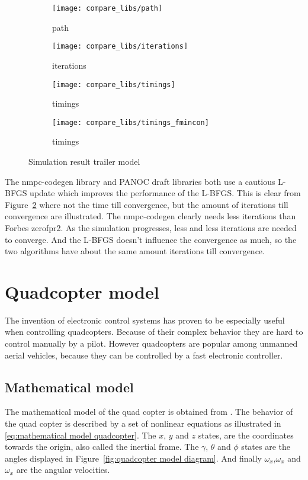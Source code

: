 \begin{figure}[H]
	\centering
	\begin{subfigure}[b]{0.45\textwidth}
		\centering
		\texttt{[image: compare\_libs/path]}
		\caption{path}
		\label{fig:solution path trailer example}
	\end{subfigure}
	\hfill
	\begin{subfigure}[b]{0.45\textwidth}
		\centering
		\texttt{[image: compare\_libs/iterations]}
		\caption{iterations}
		\label{fig:iterations trailer example}
	\end{subfigure}
	
	\begin{subfigure}[b]{0.45\textwidth}
		\centering
		\texttt{[image: compare\_libs/timings]}
		\caption{timings}
		\label{fig:timings trailer example}
	\end{subfigure}
	\hfill
	\begin{subfigure}[b]{0.45\textwidth}
		\centering
		\texttt{[image: compare\_libs/timings\_fmincon]}
		\caption{timings}
		\label{fig:timings fmincon Matlab trailer example}
	\end{subfigure}
	\caption{Simulation result trailer model}
	\label{fig:simulation result trailer model}
\end{figure}

The nmpc-codegen library and PANOC draft libraries both use a cautious L-BFGS update which improves the performance of the L-BFGS. This is clear from Figure~\ref{fig:iterations trailer example} where not the time till convergence, but the amount of iterations till convergence are illustrated. The nmpc-codegen clearly needs less iterations than  Forbes zerofpr2. As the simulation progresses, less and less iterations are needed to converge. And the L-BFGS doesn't influence the convergence as much, so the two algorithms have about the same amount iterations till convergence.


\section{Quadcopter model}
The invention of electronic control systems has proven to be especially useful when controlling quadcopters. Because of their complex behavior they are hard to control manually by a pilot. However quadcopters are popular among unmanned aerial vehicles, because they can be controlled by a fast electronic controller.

\subsection{Mathematical model}
The mathematical model of the quad copter is obtained from \cite{Agudelo}. The behavior of the quad copter is described by a set of nonlinear equations as illustrated in \eqref{eq:mathematical model quadcopter}. The $x$, $y$ and $z$ states, are the coordinates towards the origin, also called the inertial frame. The $\gamma$, $\theta$ and $\phi$ states are the angles displayed in Figure~\ref{fig:quadcopter model diagram}. And finally $\omega_x$,$\omega_x$ and $\omega_x$ are the angular velocities.

